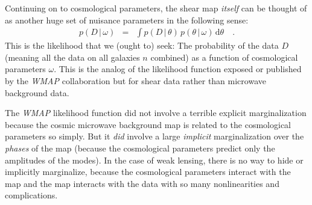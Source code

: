 \documentclass[12pt, pdftex]{article}
\newcommand{\dd}{\mathrm{d}}
\newcommand{\given}{\,|\,}
\newcommand{\shearpars}{\theta}
\newcommand{\cosmopars}{\omega}
\newcommand{\data}{D}
\begin{document}
Continuing on to cosmological parameters, the shear map \emph{itself}
can be thought of as another huge set of nuisance parameters in the
following sense:
\begin{eqnarray}\displaystyle
p(\data\given\cosmopars) &=&
\int p(\data\given\shearpars)\,p(\shearpars\given\cosmopars)\,\dd\shearpars
\quad.
\end{eqnarray}
This is the likelihood that we (ought to) seek: The probability of the
data $\data$ (meaning all the data on all galaxies $n$ combined) as a
function of cosmological parameters $\cosmopars$.  This is the analog
of the likelihood function exposed or published by the \textsl{WMAP}
collaboration but for shear data rather than microwave background
data.

The \textsl{WMAP} likelihood function did not involve a terrible
explicit marginalization because the cosmic microwave background map
is related to the cosmological parameters so simply.  But it
\emph{did} involve a large \emph{implicit} marginalization over the
\emph{phases} of the map (because the cosmological parameters predict
only the amplitudes of the modes).  In the case of weak lensing, there
is no way to hide or implicitly marginalize, because the cosmological
parameters interact with the map and the map interacts with the data
with so many nonlinearities and complications.
\end{document}
